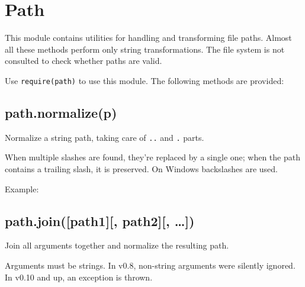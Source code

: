 \section{Path}\label{path}

\begin{Shaded}
\begin{Highlighting}[]
 
\end{Highlighting}
\end{Shaded}

This module contains utilities for handling and transforming file paths.
Almost all these methods perform only string transformations. The file
system is not consulted to check whether paths are valid.

Use \texttt{require(\textquotesingle{}path\textquotesingle{})} to use
this module. The following methods are provided:

\subsection{path.normalize(p)}\label{path.normalizep}

Normalize a string path, taking care of
\texttt{\textquotesingle{}..\textquotesingle{}} and
\texttt{\textquotesingle{}.\textquotesingle{}} parts.

When multiple slashes are found, they're replaced by a single one; when
the path contains a trailing slash, it is preserved. On Windows
backslashes are used.

Example:

\begin{Shaded}
\begin{Highlighting}[]
\NormalTok{(}\NormalTok{)}
\end{Highlighting}
\end{Shaded}

\subsection{path.join({[}path1{]}{[}, path2{]}{[},
\ldots{}{]})}\label{path.joinpath1-path2}

Join all arguments together and normalize the resulting path.

Arguments must be strings. In v0.8, non-string arguments were silently
ignored. In v0.10 and up, an exception is thrown.

